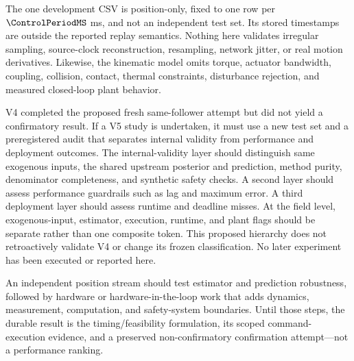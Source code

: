 The one development CSV is position-only, fixed to one row per
\(\ControlPeriodMS\) ms, and not an independent test set.  Its stored
timestamps are outside the reported replay semantics.  Nothing here validates
irregular sampling, source-clock reconstruction, resampling, network jitter,
or real motion derivatives.  Likewise, the kinematic model omits torque,
actuator bandwidth, coupling, collision, contact, thermal constraints,
disturbance rejection, and measured closed-loop plant behavior.

V4 completed the proposed fresh same-follower attempt but did not yield a
confirmatory result.  If a V5 study is undertaken, it must use a new test set
and a preregistered audit that separates internal validity from performance
and deployment outcomes.  The internal-validity layer should distinguish
same exogenous inputs, the shared upstream posterior and prediction, method
purity, denominator completeness, and synthetic safety checks.  A second
layer should assess performance guardrails such as lag and maximum error.  A
third deployment layer should assess runtime and deadline misses.  At the
field level, exogenous-input, estimator, execution, runtime, and plant flags
should be separate rather than one composite token.  This proposed hierarchy
does not retroactively validate V4 or change its frozen classification.  No
later experiment has been executed or reported here.

An independent position stream should test estimator and prediction
robustness, followed by hardware or hardware-in-the-loop work that adds
dynamics, measurement, computation, and safety-system boundaries.  Until
those steps, the durable result is the timing/feasibility formulation, its
scoped command-execution evidence, and a preserved non-confirmatory
confirmation attempt---not a performance ranking.
